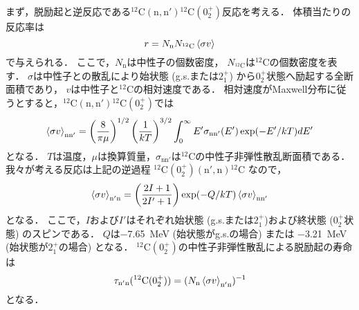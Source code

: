\documentclass[../master]{subfiles}
\begin{document}
まず，脱励起と逆反応である${}^{12}\mathrm{C}(\mathrm{n},\mathrm{n}'){}^{12}\mathrm{C}(0_2^+)$反応を考える．
体積当たりの反応率は
\begin{equation}
  r = N_{\text{n}}N_{{}^{12}\mathrm{C}}\braket{\sigma v}%
  \label{eq::r}
\end{equation}
で与えられる．
ここで，$N_{\text{n}}$は中性子の個数密度，
$N_{{}^{12}\mathrm{C}}$は${}^{12}\mathrm{C}$の個数密度を表す．
$\sigma$は中性子との散乱により始状態 (g.s.または$2_{1}^{+}$) から$0_2^+$状態へ励起する全断面積であり，
$v$は中性子と${}^{12}\mathrm{C}$の相対速度である．
相対速度がMaxwell分布に従うとすると，${}^{12}\mathrm{C}(\mathrm{n},\mathrm{n'}){}^{12}\mathrm{C} (0_2^+)$では
\begin{equation}
  \braket{\sigma v}_{\mathrm{nn'}} =
  \left(\frac{8}{\pi\mu}\right)^{1/2}\left(\frac{1}{kT}\right)^{3/2}
  \int^{\infty}_{0}E'\sigma_{\mathrm{nn'}}(E')\exp(-E'/kT)dE'
  \label{eq::sigmann'}
\end{equation}
となる．
$T$は温度，$\mu$は換算質量，$\sigma_{\mathrm{n}\mathrm{n}'}$は${}^{12}\mathrm{C}$の中性子非弾性散乱断面積である．
我々が考える反応は上記の逆過程 ${}^{12}\mathrm{C}(0_2^+)(\mathrm{n}',\mathrm{n}){}^{12}\mathrm{C}$ なので，
\begin{equation}
  \braket{\sigma v}_{\mathrm{n'n}} = \left(\frac{2I+1}{2I'+1}\right)
  \exp(-Q/kT)\braket{\sigma v}_{\mathrm{nn'}}
  \label{eq::sigman'n}
\end{equation}
となる．
ここで，$I$および$I'$はそれぞれ始状態 (g.s.または$2_{1}^{+}$)および終状態 ($0_2^+$状態) のスピンである．
$Q$は\SI{-7.65}{\mega\electronvolt} (始状態がg.s.の場合) または
\SI{-3.21}{\mega\electronvolt} (始状態が$2_{1}^{+}$の場合) となる．
${}^{12}\mathrm{C} (0_2^+)$の中性子非弾性散乱による脱励起の寿命は
\begin{equation}
  \tau_{\mathrm{n'n}}({}^{12}\mathrm{C} (0_2^+)) =
  (N_{\mathrm{n}}\braket{\sigma v}_{\mathrm{n'n}})^{-1} %
  \label{eq::tau}
\end{equation}
となる．
\end{document}
